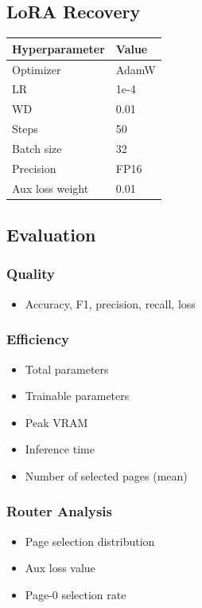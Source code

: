 \subsection{LoRA Recovery}

\begin{table}[H]
\centering
\small
\begin{tabular}{ll}
\toprule
\textbf{Hyperparameter} & \textbf{Value} \\
\midrule
Optimizer & AdamW \\
LR & 1e-4 \\
WD & 0.01 \\
Steps & 50 \\
Batch size & 32 \\
Precision & FP16 \\
Aux loss weight & 0.01 \\
\bottomrule
\end{tabular}
\end{table}

\subsection{Evaluation}

\subsubsection{Quality}
\begin{itemize}
\item Accuracy, F1, precision, recall, loss

\end{itemize}
\subsubsection{Efficiency}
\begin{itemize}
\item Total parameters
\item Trainable parameters
\item Peak VRAM
\item Inference time
\item Number of selected pages (mean)

\end{itemize}
\subsubsection{Router Analysis}
\begin{itemize}
\item Page selection distribution
\item Aux loss value
\item Page-0 selection rate

\end{itemize}
